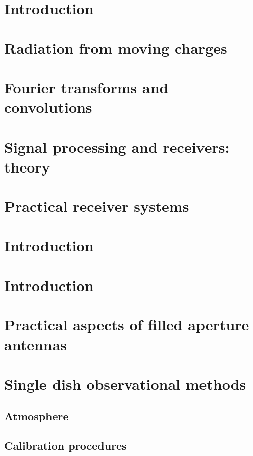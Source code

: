 \documentclass[12pt]{article}
\newcommand{\mar}[1]{\hspace{0pt}\marginpar{-\textcolor{black}{#1}-}}
\begin{document}
\tableofcontents

\reversemarginpar

\newpage
\section{Introduction}

\newpage
\section{Radiation from moving charges}
\mar{37}

\newpage
\section{Fourier transforms and convolutions}

\newpage
\section{Signal processing and receivers: theory}

\newpage
\section{Practical receiver systems}

\newpage
\section{Introduction}

\newpage
\section{Introduction}

\newpage
\section{Practical aspects of filled aperture antennas}

\newpage
\section{Single dish observational methods}
\subsection{Atmosphere}
\subsection{Calibration procedures}
\end{document}
